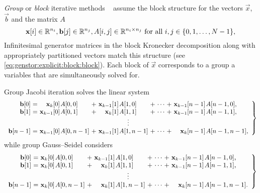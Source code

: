 \emph{Group} or \emph{block} iterative methods%
~\citet[Section~10.4]{stewart2009probability} assume the block
structure for the vectors $\vec{x}$, $\vec{b}$ and the matrix $A$
\begin{equation}
  \bm{\mathrm{x}}[i] \in \mathbb{R}^{n_i}, \bm{\mathrm{b}}[j] \in \mathbb{R}^{n_j}, A[i, j] \in
  \mathbb{R}^{n_i \times n_j} \text{ for all $i, j \in \{0, 1, \ldots,
    N - 1\}$,}
\end{equation}
Infinitesimal generator matrices in the block Kronecker decomposition
along with appropriately partitioned vectors match this structure (see
\vref{eq:genstor:explicit:block:block}). Each block of $\vec{x}$
corresponds to a group a variables that are simultaneously solved for.

Group Jacobi iteration solves the linear system
{\small\begin{equation}
    \left.
      \begin{array}{r@{${} = {}$}*{2}{r@{\kern1pt}l@{${} + {}$}}c@{${} + {}$}r@{\kern1pt}l}
        \vec{b}[0] & \vec{x}_{k}[0] & A[0,0] & \vec{x}_{k - 1}[1] & A[1,0] & \cdots & \vec{x}_{k - 1}[n - 1] & A[n - 1,0] \text,\\
        \vec{b}[1] & \vec{x}_{k - 1}[0] & A[0,1] & \vec{x}_{k}[1] & A[1,1] & \cdots & \vec{x}_{k - 1}[n - 1] & A[n - 1,1] \text,\\
        \multicolumn{8}{c}{$\vdots$} \\
        \vec{b}[n - 1] & \vec{x}_{k - 1}[0] & A[0,n - 1] & \vec{x}_{k - 1}[1] & A[1,n - 1] & \cdots & \vec{x}_{k}[n - 1] & A[n - 1,n - 1] \text,\\
      \end{array}
    \right\}
  \end{equation}}%
while group Gauss--Seidel considers
{\small\begin{equation}
    \left.
      \begin{array}{r@{${} = {}$}*{2}{r@{\kern1pt}l@{${} + {}$}}c@{${} + {}$}r@{\kern1pt}l}
        \vec{b}[0] & \vec{x}_{k}[0] & A[0,0] & \vec{x}_{k - 1}[1] & A[1,0] & \cdots & \vec{x}_{k - 1}[n - 1] & A[n - 1,0] \text,\\
        \vec{b}[1] & \vec{x}_{k}[0] & A[0,1] & \vec{x}_{k}[1] & A[1,1] & \cdots & \vec{x}_{k - 1}[n - 1] & A[n - 1,1] \text,\\
        \multicolumn{8}{c}{$\vdots$} \\
        \vec{b}[n - 1] & \vec{x}_{k}[0] & A[0,n - 1] & \vec{x}_{k}[1] & A[1,n - 1] & \cdots & \vec{x}_{k}[n - 1] & A[n - 1,n - 1] \text.\\
      \end{array}
    \right\}
  \end{equation}}

